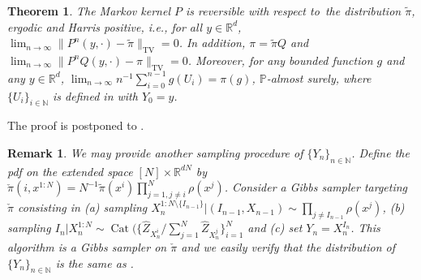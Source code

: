 \documentclass{article}
\newtheorem{theorem}{Theorem}
\newtheorem{remark}{Remark}
\def\transfo{\operatorname{T}}
\def\rmd{\operatorname{d}\hspace{-2pt}}
\def\PP{\mathbb{P}}
\def\rset{\mathbb{R}}
\def\nset{\mathbb{N}}
\def\rmd{\mathrm{d}}
\def\eqsp{\,}
\def\msa{\mathsf{A}}
\def\borel{\mathcal{B}}
\def\wrt{w.r.t.}
\newcommand{\tvnorm}[1]{\| #1 \|_{\mathrm{TV}}}
\def\ie{\textit{i.e.}}
\def\eqsp{\;}
\newcommand{\1}{\mathds{1}}
\newcommand{\indi}[1]{\1_{#1}}
\newcommand{\chunku}[3]{#1^{#2:#3}}
\newcommand{\chunkum}[4]{#1^{#2:#3 \setminus \{#4\}}}
\def\const{Z}
\newcommand{\estConstC}[1]{\widehat{Z}_{#1}}
\def\tpi{\tilde{\pi}}
\def\msa{\mathsf{A}}
\def\msb{\mathsf{B}}
\def\rset{\mathbb{R}}
\def\zset{\mathbb{Z}}
\def\nset{\mathbb{N}}
\def\rmd{\mathrm{d}}
\def\likelihood{\mathrm{L}}
\def\wrt{with respect to}
\begin{document}
\begin{theorem}
\label{lem:invariant_P}
The Markov kernel $P$ is reversible \wrt~the distribution $\tpi$,  ergodic and Harris positive, \ie, for all $y\in \rset^d$,
$\lim_{n\to\infty} \tvnorm{P^n(y, \cdot) - \tpi} = 0$. In addition,  $\pi = \tpi Q$ and 
$\lim_{n\to\infty} \tvnorm{P^n Q(y, \cdot) - \pi} = 0$.
Moreover, for any bounded function $g$ and any $y\in\rset^d$, $\lim_{n\to\infty}n^{-1}\sum_{i=0}^{n-1} g(U_i) = \pi(g)$, $\PP$-almost surely, where $\{U_i\}_{i \in \nset}$ is defined in  with $Y_0 = y$. 
\end{theorem}
The proof is postponed to . 

\begin{remark}\em
\label{rem:gibbs-interpretation}
We may provide another sampling procedure of $\{ Y_n \}_{n\in\nset}$.
Define the pdf on the extended space $[N] \times\rset^{d N}$  by  
$\check{\pi}(i, \chunku{x}{1}{N}) = N^{-1} \tpi(x^i) \prod_{j=1, j\neq i}^N \rho(x^j)$.
Consider a Gibbs sampler  targeting $\check{\pi}$ consisting in   (a) sampling $\chunkum{X_n}{1}{N}{I_{n-1}}|(I_{n-1}, X_{n-1})\sim\prod_{j\neq I_{n-1}}\rho(x^j)$,   (b) sampling  $I_n|\chunku{X_n}{1}{N} \sim \operatorname{Cat}( \{\estConstC{X_n^i} / \sum_{j=1}^N \estConstC{X_n^j} \}_{i=1}^N $ and (c) set $Y_n = X_n^{I_n}$.  This algorithm is a Gibbs sampler on $\check{\pi}$ and we easily verify that the distribution of $\{Y_n\}_{n\in\nset}$ is the same as .
\end{remark}
\end{document}
